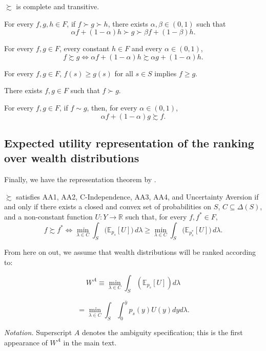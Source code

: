 \documentclass[../../../00-main.tex]{subfiles}
\begin{document}
\begin{ax.AA}
$\succsim$ is complete and transitive.
\end{ax.AA}

\begin{ax.AA}[Continuity]
For every $f,g,h \in F$,  if $f \succ g \succ h $, there exists $\alpha, \beta \in (0,1)$ such that 
$$ \alpha f + (1-\alpha) h \succ g \succ \beta f + (1-\beta) h .$$ 
\end{ax.AA}

\begin{ax.C}[C-Independence]
For every $f,g \in F$, every constant $h \in F$ and every $\alpha \in (0,1)$,
$$ f \succsim g \iff \alpha f + (1-\alpha)h \succsim \alpha g + (1-\alpha)h. $$
\end{ax.C}

\begin{ax.AA}[Monotonicity]
For every $f,g \in F$, $f(s) \geq g(s)$ for all $s \in S$ implies $f \geq g$.
\end{ax.AA}

\begin{ax.AA}
There exists $f,g \in F$ such that $f \succ g$.
\end{ax.AA}

\begin{ax.U}
For every $f,g \in F$, if $f \sim g$, then, for every $\alpha \in (0,1)$,
$$ \alpha f + (1-\alpha)g \succsim f. $$
\end{ax.U}

\subsection{Expected utility representation of the ranking over wealth distributions}

\par  Finally, we have the representation theorem by \cite{gs89}.

\begin{tm}
$\succsim$ satisfies AA1, AA2, C-Independence, AA3, AA4, and Uncertainty Aversion if and only if there exists a closed and convex set of probabilities on $S$, $C \subseteq \Delta(S)$, and a non-constant function $U: Y \to \mathbb{R}$ such that, for every $f, f^* \in F$,
\[
f \succsim f^*
\iff
\min_{\lambda \in C} \int_{S} \big(\mathbb{E}_{p_s}[U]\big)\, d\lambda
\ge
\min_{\lambda \in C} \int_{S} \big(\mathbb{E}_{p_s^*}[U]\big)\, d\lambda.
\]
\end{tm}

From here on out, we assume that wealth distributions will be ranked according to:

$$ W^{A} \equiv \min_{\lambda \in C} \int_{S} (\mathbb{E}_{p_s}[U]) d \lambda $$

$$ = \min_{\lambda \in C} \int_{S} \int_{0}^{\bar{y}} p_s(y) U(y) dy d\lambda. $$

\par \textit{Notation.} Superscript $A$ denotes the ambiguity specification; this is the first appearance of $W^{A}$ in the main text.
\end{document}
